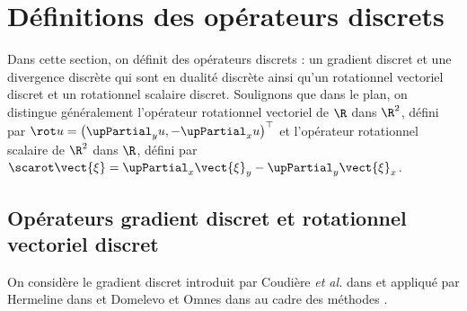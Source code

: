\section{Définitions des opérateurs discrets} \label{sec:definitions_operateurs_discrets}

Dans cette section, on définit des opérateurs discrets : un gradient discret et une divergence discrète qui sont en dualité discrète ainsi qu'un rotationnel vectoriel discret et un rotationnel scalaire discret. Soulignons que dans le plan, on distingue généralement l’opérateur rotationnel vectoriel de $\R$ dans $\R^2$, défini par $\rot u = \big( \upPartial_y u, - \upPartial_x u \big)^\top$ et l’opérateur rotationnel scalaire de $\R^2$ dans $\R$, défini par $\scarot \vect{\xi} = \upPartial_x \vect{\xi}_y - \upPartial_y \vect{\xi}_x$.

\subsection{Opérateurs gradient discret et rotationnel vectoriel discret}

On considère le gradient discret introduit par Coudière \emph{et al.} dans \cite{coudiere_convergence_1999} et appliqué par Hermeline dans \cite{hermeline_finite_2000} et Domelevo et Omnes dans \cite{domelevo_finite_2005} au cadre des méthodes \ddfv.

